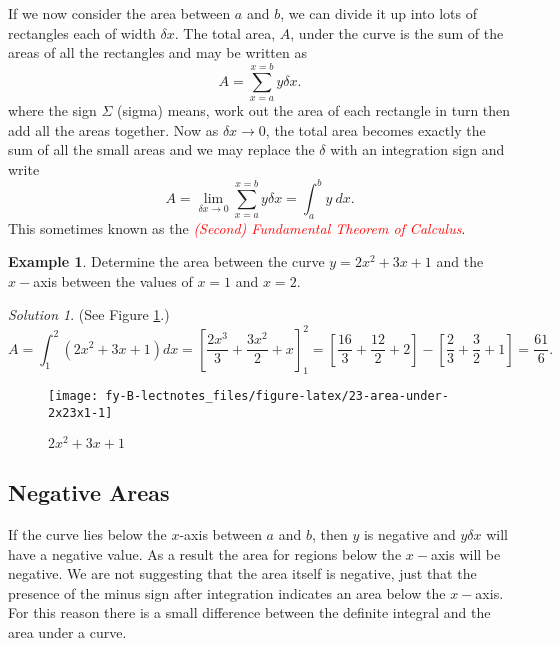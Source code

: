 \documentclass[
  11pt,
  oneside]{book}
\newcommand{\slide}{}
\theoremstyle{definition}
\theoremstyle{definition}
\newtheorem{example}{Example}[chapter]
\theoremstyle{definition}
\theoremstyle{definition}
\theoremstyle{remark}
\newtheorem*{solution}{Solution}
\begin{document}
\slide

If we now consider the area between \(a\) and \(b\), we can divide it up into lots of rectangles each of width \(\delta x\). The total area, \(A\), under the curve is the sum of the areas of all the rectangles and may be written as
\[
A=\sum_{x=a}^{x=b}y\delta x.
\]
where the sign \(\Sigma\) (sigma) means, work out the area of each rectangle in turn then add all the areas together. Now as \(\delta x \to 0\), the total area becomes exactly the sum of all the small areas and we may replace the \(\delta\) with an integration sign and write
\[
A =\lim\limits_{\delta x\to 0}\sum_{x=a}^{x=b}y\delta x = \int_a^b y\ dx.
\]
This sometimes known as the \textcolor{red}{\em (Second) Fundamental Theorem of Calculus}.
\slide

\begin{example}
Determine the area between the curve \(y=2x^2+3x+1\) and the \(x-\)axis between the values of \(x=1\) and \(x=2\).
\end{example}

\begin{solution}
\leavevmode

(See Figure \ref{fig:23-area-under-2x23x1}.)
\[
A=\int_1^2(2x^2+3x+1)dx = \left[\frac{2x^3}{3}+\frac{3x^2}{2}+x\right]_1^2 = \left[\frac{16}{3}+\frac{12}{2}+2\right]-\left[\frac{2}{3}+\frac 32 + 1\right] = \frac{61}{6}.
\]

\begin{figure}

{\centering \texttt{[image: fy-B-lectnotes\_files/figure-latex/23-area-under-2x23x1-1]} 

}

\caption{$2x^2+3x+1$}\label{fig:23-area-under-2x23x1}
\end{figure}

\end{solution}

\slide

\subsection{Negative Areas}\label{negative-areas}

If the curve lies below the \(x\)-axis between \(a\) and \(b\), then \(y\) is negative and \(y\delta x\) will have a negative value. As a result the area for regions below the \(x-\)axis will be negative. We are not suggesting that the area itself is negative, just that the presence of the minus sign after integration indicates an area below the \(x-\)axis. For this reason there is a small difference between the definite integral and the area under a curve.
\end{document}
